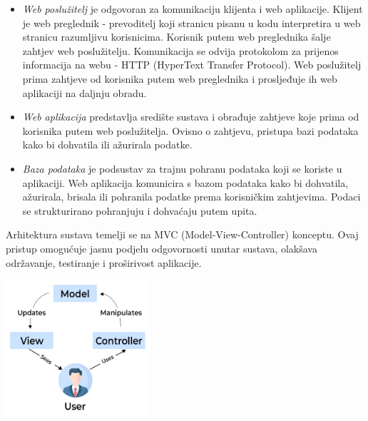 	\begin{itemize}
		\item \textit {Web poslužitelj} je odgovoran za komunikaciju klijenta i web aplikacije. Klijent je web preglednik - prevoditelj koji stranicu pisanu u kodu interpretira u web stranicu razumljivu korisnicima.  Korisnik putem web preglednika šalje zahtjev web poslužitelju. Komunikacija se odvija protokolom za prijenos informacija na webu - HTTP (HyperText Transfer Protocol). Web poslužitelj prima zahtjeve od korisnika putem web preglednika i prosljeđuje ih web aplikaciji na daljnju obradu.
		
		\item \textit {Web aplikacija} predstavlja središte sustava i obrađuje zahtjeve koje prima od korisnika putem web poslužitelja. Ovisno o zahtjevu, pristupa bazi podataka kako bi dohvatila ili ažurirala podatke.
		
		\item \textit {Baza podataka} je podsustav za trajnu pohranu podataka koji se koriste u aplikaciji. Web aplikacija komunicira s bazom podataka kako bi dohvatila, ažurirala, brisala ili pohranila podatke prema korisničkim zahtjevima. Podaci se strukturirano pohranjuju i dohvaćaju putem upita. \newline
		
	\end{itemize}
	
		Arhitektura sustava temelji se na MVC (Model-View-Controller) konceptu. Ovaj pristup omogućuje jasnu podjelu odgovornosti unutar sustava, olakšava održavanje, testiranje i proširivost aplikacije. 
		
		\begin{center}
			\includegraphics[width=0.4\textwidth]{slike/mvc.png} %
		\end{center}
		
